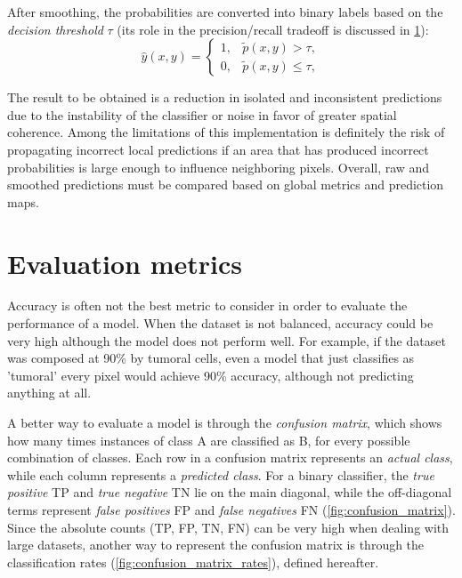 After smoothing, the probabilities are converted into binary labels based on the \textit{decision threshold} $\tau$ (its role in the precision/recall tradeoff is discussed in \cref{sec:evaluation_metrics}):
\begin{equation}
    \hat{y}(x,y) =
    \begin{cases}
        1, & \tilde{p}(x,y) > \tau,\\
        0, & \tilde{p}(x,y) \leq \tau,
    \end{cases}
    \label{eq:threshold_after_smoothing}
\end{equation}

The result to be obtained is a reduction in isolated and inconsistent predictions due to the instability of the classifier or noise in favor of greater spatial coherence. Among the limitations of this implementation is definitely the risk of propagating incorrect local predictions if an area that has produced incorrect probabilities is large enough to influence neighboring pixels. Overall, raw and smoothed predictions must be compared based on global metrics and prediction maps.

\section{Evaluation metrics}
\label{sec:evaluation_metrics}

Accuracy is often not the best metric to consider in order to evaluate the performance of a model. When the dataset is not balanced, accuracy could be very high although the model does not perform well. For example, if the dataset was composed at 90\% by tumoral cells, even a model that just classifies as 'tumoral' every pixel would achieve 90\% accuracy, although not predicting anything at all.

A better way to evaluate a model is through the \textit{confusion matrix}, which shows how many times instances of class A are classified as B, for every possible combination of classes. Each row in a confusion matrix represents an \textit{actual class}, while each column represents a \textit{predicted class}.
For a binary classifier, the \textit{true positive} TP and \textit{true negative} TN lie on the main diagonal, while the off-diagonal terms represent \textit{false positives} FP and \textit{false negatives} FN (\cref{fig:confusion_matrix}).
Since the absolute counts (TP, FP, TN, FN) can be very high when dealing with large datasets, another way to represent the confusion matrix is through the classification rates (\cref{fig:confusion_matrix_rates}), defined hereafter.

